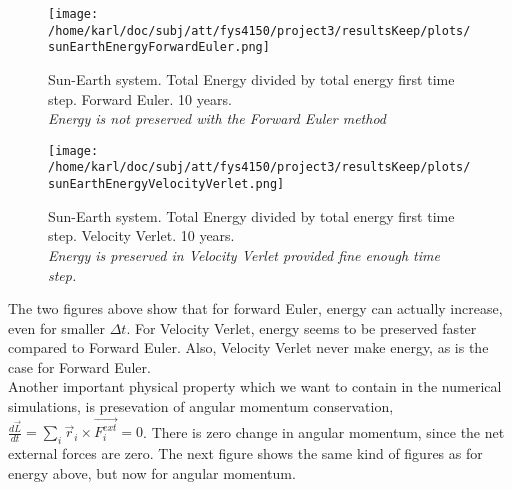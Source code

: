 \documentclass{article}
\begin{document}
\begin{minipage}{.49\textwidth} 
	\begin{figure}[H]
		\centering
		\texttt{[image: /home/karl/doc/subj/att/fys4150/project3/resultsKeep/plots/sunEarthEnergyForwardEuler.png]}
		\caption{Sun-Earth system. Total Energy divided by total energy first time step. Forward Euler. 10 years. \\ \textit{Energy is not preserved with the Forward Euler method}}
		\label{1}
	\end{figure}
\end{minipage}\hfill
\begin{minipage}{.49\textwidth} 
	\begin{figure}[H]
		\centering
		\texttt{[image: /home/karl/doc/subj/att/fys4150/project3/resultsKeep/plots/sunEarthEnergyVelocityVerlet.png]}
		\caption{Sun-Earth system. Total Energy divided by total energy first time step. Velocity Verlet. 10 years. \\ \textit{Energy is preserved in Velocity Verlet provided fine enough time step. }}
		\label{1}
	\end{figure}
\end{minipage}\hfill
\vspace{2ex}

The two figures above show that for forward Euler, energy can actually increase, even for smaller $\Delta t$. For Velocity Verlet, energy seems to be preserved faster compared to Forward Euler. Also, Velocity Verlet never make energy, as is the case for Forward Euler.\\

Another important physical property which we want to contain in the numerical simulations, is presevation of angular momentum conservation, $\frac{d \vec{L}}{dt} = \sum_i \vec{r}_i \times \vec{F^{ext}_i} = 0$. There is zero change in angular momentum, since the net external forces are zero. The next figure shows the same kind of figures as for energy above, but now for angular momentum. 
\end{document}
